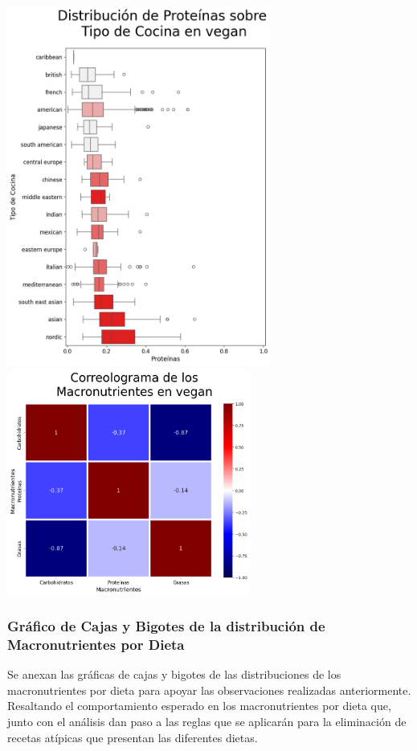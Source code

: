 \documentclass[12pt,a4paper]{article}
\begin{document}
            \begin{center}
                \includegraphics[width=0.65\textwidth]{Resources/2_03_plot_05_2.png}
                \includegraphics[width=0.6\textwidth]{Resources/2_03_plot_05_4.png}
            \end{center}

        \subsubsection{Gráfico de Cajas y Bigotes de la distribución de Macronutrientes por Dieta}
            Se anexan las gráficas de cajas y bigotes de las distribuciones de los 
            macronutrientes por dieta para apoyar las observaciones realizadas anteriormente. 
            Resaltando el comportamiento esperado en los macronutrientes por dieta que, junto 
            con el análisis dan paso a las reglas que se aplicarán para la eliminación de recetas 
            atípicas que presentan las diferentes dietas.
\end{document}
